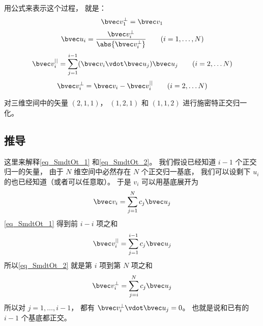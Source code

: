用公式来表示这个过程， 就是：
\begin{equation}
\bvec v_1^\bot = \bvec v_1
\end{equation}
\begin{equation}
\bvec u_i = \frac{\bvec v_i^\bot}{\abs{\bvec v_i^\bot}} \qquad (i = 1, \dots ,N)
\end{equation}
\begin{equation}\label{eq_SmdtOt_1}
\bvec v_i^{||} = \sum _{j=1}^{i-1} (\bvec v_i \vdot \bvec u_j) \bvec u_j \qquad (i = 2, \dots N)
\end{equation}
\begin{equation}\label{eq_SmdtOt_2}
\bvec v_i^\bot = \bvec v_i - \bvec v_i^{||} \qquad (i = 2, \dots N)
\end{equation}

\begin{exercise}{}
对三维空间中的矢量 $(2, 1, 1)$， $(1, 2, 1)$ 和 $(1, 1, 2)$ 进行施密特正交归一化。
\end{exercise}

\subsection{推导}
这里来解释\autoref{eq_SmdtOt_1} 和\autoref{eq_SmdtOt_2}。 我们假设已经知道 $i-1$ 个正交归一的矢量， 由于 $N$ 维空间中必然存在 $N$ 个正交归一基底， 我们可以设剩下 $u_i$ 的也已经知道（或者可以任意取）。 于是 $v_i$ 可以用基底展开为
\begin{equation}
\bvec v_i = \sum _{j=1}^N c_j \bvec u_j
\end{equation}
\autoref{eq_SmdtOt_1} 得到前 $i-i$ 项之和
\begin{equation}
\bvec v_i^{||} = \sum _{j=1}^{i-1} c_j\bvec u_j
\end{equation}
所以\autoref{eq_SmdtOt_2} 就是第 $i$ 项到第 $N$ 项之和
\begin{equation}
\bvec v_i^\bot = \sum _{j=i}^{N} c_j\bvec u_j
\end{equation}
所以对 $j = 1, \dots , i-1$， 都有 $\bvec v_i^\bot \vdot \bvec u_j = 0$。 也就是说和已有的 $i-1$ 个基底都正交。
